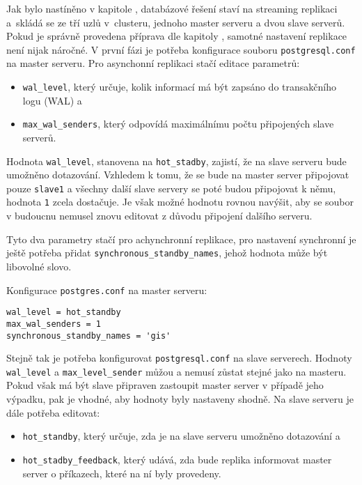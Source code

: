 
Jak bylo nastíněno v kapitole , databázové řešení staví na streaming replikaci a~skládá se ze tří uzlů v~clusteru, jednoho master serveru a dvou slave serverů. Pokud je správně provedena příprava dle kapitoly , samotné nastavení replikace není nijak náročné. V první fázi je potřeba konfigurace souboru \texttt{postgresql.conf} na master serveru. Pro asynchonní replikaci stačí editace parametrů: 
\begin{itemize}
\item \texttt{wal\_level}, který určuje, kolik informací má být zapsáno do transakčního logu (WAL) a
\item \texttt{max\_wal\_senders}, který odpovídá maximálnímu počtu připojených slave serverů. 
\end{itemize}

Hodnota \texttt{wal\_level}, stanovena na \texttt{hot\_stadby}, zajistí, že na slave serveru bude umožněno dotazování. Vzhledem k tomu, že se bude na master server připojovat pouze \texttt{slave1} a všechny další slave servery se poté budou připojovat k němu, hodnota \texttt{1} zcela dostačuje. Je však možné hodnotu rovnou navýšit, aby se soubor v budoucnu nemusel znovu editovat z důvodu připojení dalšího serveru.

Tyto dva parametry stačí pro achynchronní replikace, pro nastavení synchronní je ještě potřeba přidat \texttt{synchronous\_standby\_names}, jehož hodnota může být libovolné slovo. 

Konfigurace \texttt{postgres.conf} na master serveru:
\begin{lstlisting}
wal_level = hot_standby
max_wal_senders = 1
synchronous_standby_names = 'gis'
\end{lstlisting}

Stejně tak je potřeba konfigurovat \texttt{postgresql.conf} na slave serverech. Hodnoty \texttt{wal\_level} a \texttt{max\_level\_sender} můžou a nemusí zůstat stejné jako na masteru. Pokud však má být slave připraven zastoupit master server v případě jeho výpadku, pak je vhodné, aby hodnoty byly nastaveny shodně. Na slave serveru je dále potřeba editovat:
\begin{itemize}
  \item\texttt{hot\_standby}, který určuje, zda je na slave serveru umožněno dotazování a 
  \item\texttt{hot\_stadby\_feedback}, který udává, zda bude replika informovat master server o příkazech, které na ní byly provedeny.
\end{itemize}

